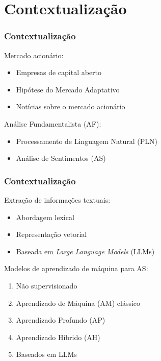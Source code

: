 \section{Contextualização} %


\begin{frame}
	\frametitle{Contextualização}
     
     Mercado acionário:
    \begin{itemize}
        \item Empresas de capital aberto
        \item Hipótese do Mercado Adaptativo
        \item Notícias sobre o mercado acionário
    \end{itemize}
    \bigskip
    Análise Fundamentalista (AF):
    \begin{itemize}
        \item Processamento de Linguagem Natural (PLN)
        \item Análise de Sentimentos (AS)
    \end{itemize}
	
\end{frame}



\begin{frame}
	\frametitle{Contextualização}
     
    Extração de informações textuais:
    \begin{itemize}
        \item Abordagem lexical
        \item Representação vetorial
        \item Baseada em \textit{Large Language Models} (LLMs)
    \end{itemize}
    \bigskip
    Modelos de aprendizado de máquina para AS:
    \begin{enumerate}
        \item Não supervisionado
        \item Aprendizado de Máquina (AM) clássico
        \item Aprendizado Profundo (AP)
        \item Aprendizado Híbrido (AH)
        \item Baseados em LLMs
    \end{enumerate}
	
\end{frame}


